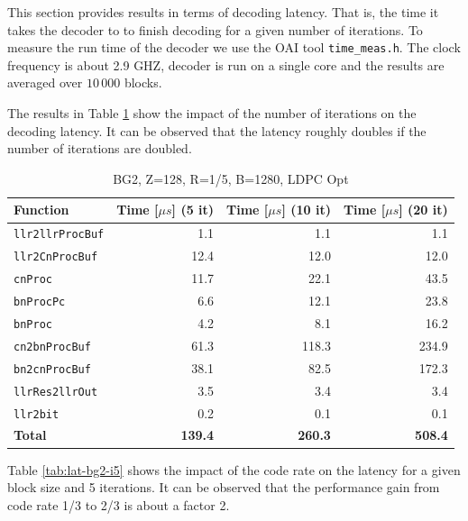 \documentclass{article}
\begin{document}
This section provides results in terms of decoding latency. That is, the time it takes the decoder to to finish decoding for a given number of iterations. To measure the run time of the decoder we use the OAI tool \texttt{time\_meas.h}. The clock frequency is about 2.9 GHZ, decoder is run on a single core and the results are averaged over $10\,000$ blocks.

The results in Table \ref{tab:lat-bg2-r15} show the impact of the number of iterations on the decoding latency. It can be observed that the latency roughly doubles if the number of iterations are doubled.

\begin{table}[ht]
  \centering
  \begin{tabular}{lrrr}
    \toprule
    \textbf{Function} & \textbf{Time [$\mu s$] (5 it)} & \textbf{Time [$\mu s$] (10 it)} & \textbf{Time [$\mu s$] (20 it)}\\
    \midrule
    \texttt{llr2llrProcBuf} & 1.1   & 1.1   & 1.1   \\
    \texttt{llr2CnProcBuf}  & 12.4  & 12.0  & 12.0  \\
    \texttt{cnProc}         & 11.7  & 22.1  & 43.5  \\
    \texttt{bnProcPc}       & 6.6   & 12.1  & 23.8  \\
    \texttt{bnProc}         & 4.2   & 8.1   & 16.2  \\
    \texttt{cn2bnProcBuf}   & 61.3  & 118.3 & 234.9 \\
    \texttt{bn2cnProcBuf}   & 38.1  & 82.5  & 172.3 \\
    \texttt{llrRes2llrOut}  & 3.5   & 3.4   & 3.4   \\
    \texttt{llr2bit}        & 0.2   & 0.1   & 0.1   \\
    \midrule
    \textbf{Total}          & \textbf{139.4} & \textbf{260.3} & \textbf{508.4} \\
    \bottomrule
  \end{tabular}
  \caption{BG2, Z=128, R=1/5, B=1280, LDPC Opt}
  \label{tab:lat-bg2-r15}
\end{table}

Table \ref{tab:lat-bg2-i5} shows the impact of the code rate on the latency for a given block size and 5 iterations. It can be observed that the performance gain from code rate 1/3 to 2/3 is about a factor 2.
\end{document}
